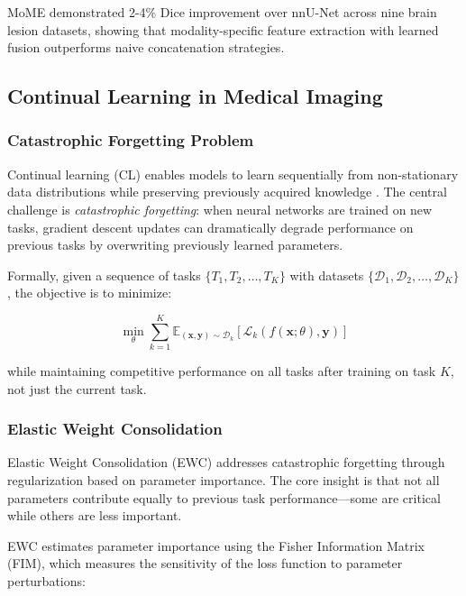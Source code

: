 \documentclass[conference]{IEEEtran}
\begin{document}
MoME demonstrated 2-4\% Dice improvement over nnU-Net across nine brain lesion datasets, showing that modality-specific feature extraction with learned fusion outperforms naive concatenation strategies.

\subsection{Continual Learning in Medical Imaging}

\subsubsection{Catastrophic Forgetting Problem}

Continual learning (CL) enables models to learn sequentially from non-stationary data distributions while preserving previously acquired knowledge \cite{parisi2019continual}. The central challenge is \textit{catastrophic forgetting}: when neural networks are trained on new tasks, gradient descent updates can dramatically degrade performance on previous tasks by overwriting previously learned parameters.

Formally, given a sequence of tasks $\{T_1, T_2, \ldots, T_K\}$ with datasets $\{\mathcal{D}_1, \mathcal{D}_2, \ldots, \mathcal{D}_K\}$, the objective is to minimize:

\begin{equation}
\min_{\theta} \sum_{k=1}^{K} \mathbb{E}_{(\mathbf{x}, \mathbf{y}) \sim \mathcal{D}_k}[\mathcal{L}_k(f(\mathbf{x}; \theta), \mathbf{y})]
\end{equation}

while maintaining competitive performance on all tasks after training on task $K$, not just the current task.

\subsubsection{Elastic Weight Consolidation}

Elastic Weight Consolidation (EWC) \cite{kirkpatrick2017ewc} addresses catastrophic forgetting through regularization based on parameter importance. The core insight is that not all parameters contribute equally to previous task performance—some are critical while others are less important.

EWC estimates parameter importance using the Fisher Information Matrix (FIM), which measures the sensitivity of the loss function to parameter perturbations:
\end{document}
